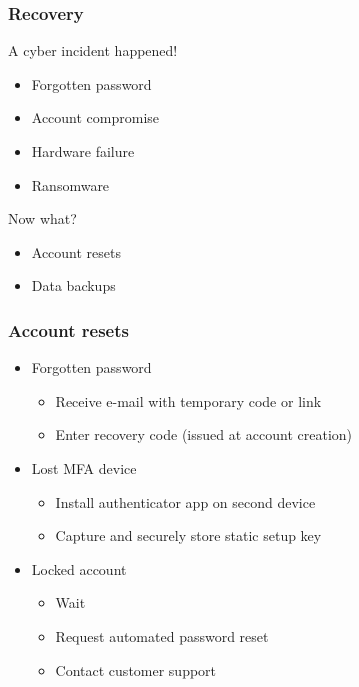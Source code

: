 \documentclass[blue]{beamer}
\begin{document}
\begin{frame}
\frametitle{Recovery}

A cyber incident happened!
\begin{itemize}
  \item Forgotten password
  \item Account compromise
  \item Hardware failure
  \item Ransomware
\end{itemize}
Now what?
\begin{itemize}
  \item Account resets
  \item Data backups
\end{itemize}

\end{frame}



\begin{frame}
\frametitle{Account resets}

\begin{itemize}
  \item Forgotten password
  \begin{itemize}
    \item Receive e-mail with temporary code or link
    \item Enter recovery code (issued at account creation)
  \end{itemize}
  \item Lost MFA device
  \begin{itemize}
    \item Install authenticator app on second device
    \item Capture and securely store static setup key
  \end{itemize}
  \item Locked account
  \begin{itemize}
    \item Wait
    \item Request automated password reset
    \item Contact customer support
  \end{itemize}
\end{itemize}

\end{frame}
\end{document}
